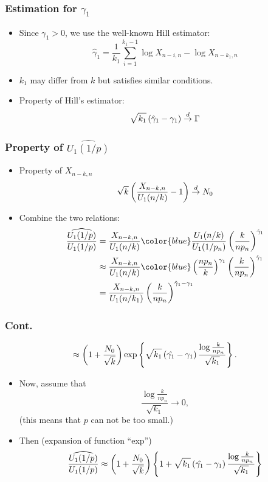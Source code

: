 \documentclass{beamer}
\begin{document}
\begin{frame}
    \frametitle{Estimation for $\gamma_1$}
\begin{itemize}
    \item Since $\gamma_1>0$, we use the well-known Hill estimator:
    $$
        \hat{\gamma}_1 =\frac{1}{k_1} \sum_{i=1}^{k_1-1} \log X_{n-i,n}-\log X_{n-k_1,n} 
    $$
    \item $k_1$ may differ from $k$ but satisfies similar conditions.
    \item Property of Hill's estimator:
    $$
        \sqrt{k_1}\left(\hat{\gamma}_1-\gamma_1\right)\stackrel{d}{\to}\Gamma
    $$
\end{itemize}
    
\end{frame}
\begin{frame}
    \frametitle{Property of $\widehat{U_1(1/p)}$}
\begin{itemize}
    \item Property of $X_{n-k,n}$
    $$
\sqrt{k}\left(\frac{X_{n-k,n}}{U_1(n/k)}-1\right)\stackrel{d}{\to} N_0
    $$
    \item Combine the two relations:
    $$
    \begin{aligned}
        \frac{\widehat{U_1(1/p)}}{U_1(1/p)} &= \frac{X_{n-k,n}}{U_1(n/k)}{\color{blue}\frac{U_1(n/k)}{U_1(1/p_n)}}\suit{\frac{k}{np_n}}^{\hat{\gamma}_1} \\
        &\approx \frac{X_{n-k,n}}{U_1(n/k)} {\color{blue}\suit{\frac{np_n}{k}}^{\gamma_1}}\suit{\frac{k}{np_n}}^{\hat{\gamma}_1}\\
        &=\frac{X_{n-k,n}}{U_1(n/k_1)} \suit{\frac{k}{np_n}}^{\hat{\gamma}_1-\gamma_1}
    \end{aligned}
    $$
\end{itemize}
    

\end{frame}

\begin{frame}
    \frametitle{Cont.}

$$
\begin{aligned}
    & \approx \left(1+\frac{N_0}{\sqrt{k}}\right)\exp\left\{\sqrt{k_1}\left(\hat{\gamma_1}-\gamma_1\right)\frac{\log \frac{k}{np_n}}{\sqrt{k_1}}\right\}.
\end{aligned}
$$
\begin{itemize}
    \item Now, assume that 
    $$
    \frac{\log \frac{k}{np_n}}{\sqrt{k_1}} \to 0,
    $$
    (this means that $p$ can not be too small.)
    \item Then (expansion of function “exp”)
    $$
    \frac{\widehat{U_1(1/p)}}{U_1(1/p)} \approx \left(1+\frac{N_0}{\sqrt{k}}\right)\left\{1+\sqrt{k_1}\left(\hat{\gamma_1}-\gamma_1\right)\frac{\log \frac{k}{np_n}}{\sqrt{k_1}}\right\}
    $$
\end{itemize}
\end{frame}
\end{document}
